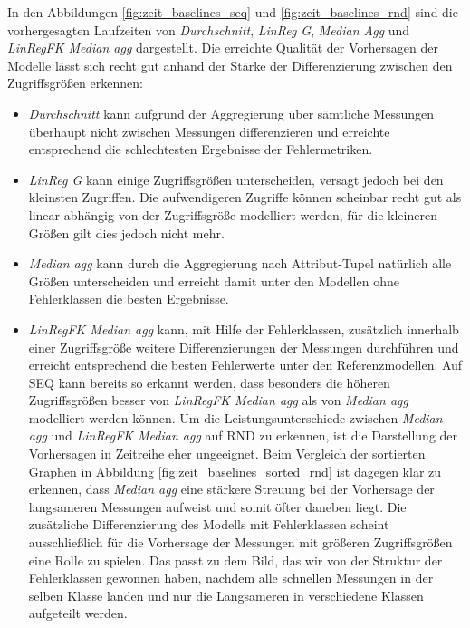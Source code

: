 \documentclass[
	12pt,
	a4paper,
	BCOR10mm,
	DIV14,
	listof=totoc,
	bibliography=totoc,
	headsepline
]{scrreprt}
\begin{document}
In den Abbildungen \ref{fig:zeit_baselines_seq} und \ref{fig:zeit_baselines_rnd} sind die vorhergesagten Laufzeiten von \textit{Durchschnitt}, \textit{LinReg G}, \textit{Median Agg} und \textit{LinRegFK Median agg} dargestellt.
Die erreichte Qualität der Vorhersagen der Modelle lässt sich recht gut anhand der Stärke der Differenzierung zwischen den Zugriffsgrößen erkennen:
\begin{itemize}
	\item \textit{Durchschnitt} kann aufgrund der Aggregierung über sämtliche Messungen überhaupt nicht zwischen Messungen differenzieren und erreichte entsprechend die schlechtesten Ergebnisse der Fehlermetriken.
	\item \textit{LinReg G} kann einige Zugriffsgrößen unterscheiden, versagt jedoch bei den kleinsten Zugriffen. Die aufwendigeren Zugriffe können scheinbar recht gut als linear abhängig von der Zugriffsgröße modelliert werden, für die kleineren Größen gilt dies jedoch nicht mehr.
	\item \textit{Median agg} kann durch die Aggregierung nach Attribut-Tupel natürlich alle Größen unterscheiden und erreicht damit unter den Modellen ohne Fehlerklassen die besten Ergebnisse. 
	\item \textit{LinRegFK Median agg} kann, mit Hilfe der Fehlerklassen, zusätzlich innerhalb einer Zugriffsgröße weitere Differenzierungen der Messungen durchführen und erreicht entsprechend die besten Fehlerwerte unter den Referenzmodellen.
	Auf SEQ kann bereits so erkannt werden, dass besonders die höheren Zugriffsgrößen besser von \textit{LinRegFK Median agg} als von \textit{Median agg} modelliert werden können.
	Um die Leistungsunterschiede zwischen \textit{Median agg} und \textit{LinRegFK Median agg} auf RND zu erkennen, ist die Darstellung der Vorhersagen in Zeitreihe eher ungeeignet.
	Beim Vergleich der sortierten Graphen in Abbildung \ref{fig:zeit_baselines_sorted_rnd} ist dagegen klar zu erkennen, dass \textit{Median agg} eine stärkere Streuung bei der Vorhersage der langsameren Messungen aufweist und somit öfter daneben liegt.
	Die zusätzliche Differenzierung des Modells mit Fehlerklassen scheint ausschließlich für die Vorhersage der Messungen mit größeren Zugriffsgrößen eine Rolle zu spielen.
	Das passt zu dem Bild, das wir von der Struktur der Fehlerklassen gewonnen haben, nachdem alle schnellen Messungen in der selben Klasse landen und nur die Langsameren in verschiedene Klassen aufgeteilt werden.
\end{itemize}
\end{document}
